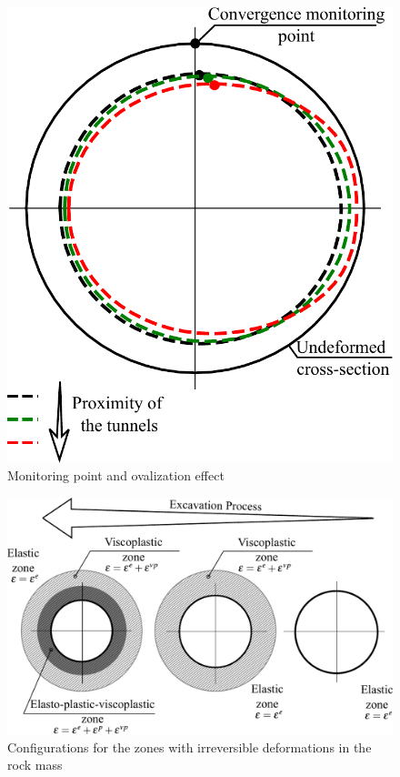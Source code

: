 \documentclass[a4paper,fleqn]{cas-sc}
\begin{document}
\begin{figure}[h!]
	\centering
	\includegraphics[scale=0.6]{Ovalization effect and monitoring point.pdf}
	\caption{Monitoring point and ovalization effect}
	\label{Ovalization effect and monitoring point}
\end{figure}
\FloatBarrier


\begin{figure}[h!]
	\centering
	\includegraphics[scale=0.6]{zones.pdf}
	\caption{Configurations for the zones with irreversible deformations in the rock mass}
	\label{zones}
\end{figure}
\FloatBarrier
\end{document}
